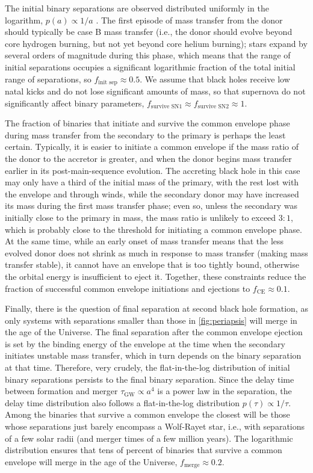 \documentclass[iop,onecolumn]{revtex4}
\begin{document}
The initial binary separations are observed distributed uniformly in the logarithm, $p(a) \propto 1/a$ \citep{Opik:1924}.  The first episode of mass transfer from the donor should typically be case B mass transfer (i.e., the donor should evolve beyond core hydrogen burning, but not yet beyond core helium burning); stars expand by several orders of magnitude during this phase, which means that the range of initial separations occupies a significant logarithmic fraction of the total initial range of separations, so $f_\textrm{init sep} \approx 0.5$.  We assume that black holes receive low natal kicks and do not lose significant amounts of mass, so that supernova do not significantly affect binary parameters, $f_\textrm{survive SN1} \approx f_\textrm{survive SN2} \approx 1$.  

The fraction of binaries that initiate and survive the common envelope phase during mass transfer from the secondary to the primary is perhaps the least certain.  Typically, it is easier to initiate a common envelope if the mass ratio of the donor to the accretor is greater, and when the donor begins mass transfer earlier in its post-main-sequence evolution.  The accreting black hole in this case may only have a third of the initial mass of the primary, with the rest lost with the envelope and through winds, while the secondary donor may have increased its mass during the first mass transfer phase; even so, unless the secondary was initially close to the primary in mass, the mass ratio is unlikely to exceed $3:1$, which is probably close to the threshold for initiating a common envelope phase.  At the same time, while an early onset of mass transfer means that the less evolved donor does not shrink as much in response to mass transfer (making mass transfer stable), it cannot have an envelope that is too tightly bound, otherwise the orbital energy is insufficient to eject it.  Together, these constraints reduce the fraction of successful common envelope initiations and ejections to $f_\textrm{CE} \approx 0.1$.  

Finally, there is the question of final separation at second black hole formation, as only systems with separations smaller than those in \autoref{fig:periapsis} will merge in the age of the Universe.  The final separation after the common envelope ejection is set by the binding energy of the envelope at the time when the secondary initiates unstable mass transfer, which in turn depends on the binary separation at that time.  Therefore, very crudely, the flat-in-the-log distribution of initial binary separations persists to the final binary separation.  Since the delay time between formation and merger $\tau_\textrm{GW} \propto a^4$ is a power law in the separation, the delay time distribution also follows a flat-in-the-log distribution $p(\tau) \propto 1/\tau$.  Among the binaries that survive a common envelope the closest will be those whose separations just barely encompass a Wolf-Rayet star, i.e., with separations of a few solar radii (and merger times of a few million years).  The logarithmic distribution ensures that tens of percent of binaries that survive a common envelope will merge in the age of the Universe, $f_\textrm{merge} \approx 0.2$.
\end{document}
